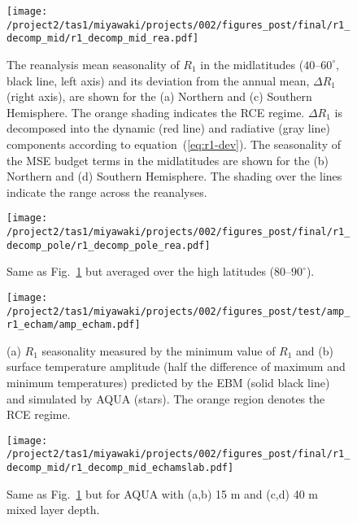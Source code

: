 \documentclass{ametsocV5}
\begin{document}
\begin{figure}[t]
  \noindent\texttt{[image: /project2/tas1/miyawaki/projects/002/figures\_post/final/r1\_decomp\_mid/r1\_decomp\_mid\_rea.pdf]}\\
  \caption{The reanalysis mean seasonality of $R_{1}$ in the midlatitudes ($40$--$60^{\circ}$, black line, left axis) and its deviation from the annual mean, $\Delta R_1$ (right axis), are shown for the (a) Northern and (c) Southern Hemisphere. The orange shading indicates the RCE regime. $\Delta R_1$ is decomposed into the dynamic (red line) and radiative (gray line) components according to equation~(\ref{eq:r1-dev}). The seasonality of the MSE budget terms in the midlatitudes are shown for the (b) Northern and (d) Southern Hemisphere. The shading over the lines indicate the range across the reanalyses.}
  \label{fig:rea-r1-decomp-mid}
\end{figure}

\begin{figure}[t]
  \noindent\texttt{[image: /project2/tas1/miyawaki/projects/002/figures\_post/final/r1\_decomp\_pole/r1\_decomp\_pole\_rea.pdf]}\\
  \caption{Same as Fig.~\ref{fig:rea-r1-decomp-mid} but averaged over the high latitudes ($80$--$90^{\circ}$).}
  \label{fig:rea-r1-decomp-pole}
\end{figure}

\begin{figure}
  \noindent\texttt{[image: /project2/tas1/miyawaki/projects/002/figures\_post/test/amp\_r1\_echam/amp\_echam.pdf]}\\
  \caption{(a) $R_1$ seasonality measured by the minimum value of $R_1$ and (b) surface temperature amplitude (half the difference of maximum and minimum temperatures) predicted by the EBM (solid black line) and simulated by AQUA (stars). The orange region denotes the RCE regime.}
  \label{fig:amp-r1-echam}
\end{figure}

\begin{figure}[t]
    \noindent\texttt{[image: /project2/tas1/miyawaki/projects/002/figures\_post/final/r1\_decomp\_mid/r1\_decomp\_mid\_echamslab.pdf]}\\
    \caption{Same as Fig.~\ref{fig:rea-r1-decomp-mid} but for AQUA with (a,b) 15 m and (c,d) 40 m mixed layer depth.}
\label{fig:echam-rce}
\end{figure}
\end{document}
